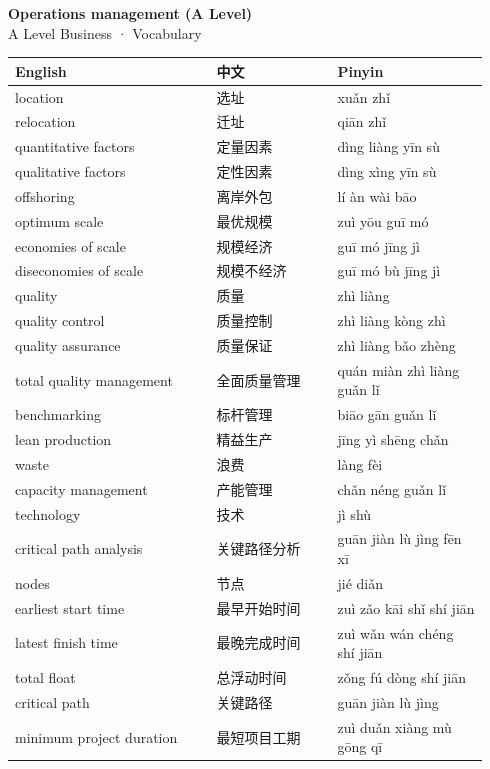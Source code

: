 \documentclass[11pt]{article}
\begin{document}
\begin{center}
  {\LARGE\bfseries Operations management (A Level)}\\[0.35em]
  {\large A Level Business · Vocabulary}
\end{center}
\vspace{0.6em}

\begin{longtable}{@{}p{0.40\linewidth}p{0.24\linewidth}p{0.30\linewidth}@{}}
\toprule
\textbf{English} & \textbf{中文} & \textbf{Pinyin} \\
\midrule
\endhead
\bottomrule
\endlastfoot
location & 选址 & xuǎn zhǐ \\
relocation & 迁址 & qiān zhǐ \\
quantitative factors & 定量因素 & dìng liàng yīn sù \\
qualitative factors & 定性因素 & dìng xìng yīn sù \\
offshoring & 离岸外包 & lí àn wài bāo \\
optimum scale & 最优规模 & zuì yōu guī mó \\
economies of scale & 规模经济 & guī mó jīng jì \\
diseconomies of scale & 规模不经济 & guī mó bù jīng jì \\
quality & 质量 & zhì liàng \\
quality control & 质量控制 & zhì liàng kòng zhì \\
quality assurance & 质量保证 & zhì liàng bǎo zhèng \\
total quality management & 全面质量管理 & quán miàn zhì liàng guǎn lǐ \\
benchmarking & 标杆管理 & biāo gān guǎn lǐ \\
lean production & 精益生产 & jīng yì shēng chǎn \\
waste & 浪费 & làng fèi \\
capacity management & 产能管理 & chǎn néng guǎn lǐ \\
technology & 技术 & jì shù \\
critical path analysis & 关键路径分析 & guān jiàn lù jìng fēn xī \\
nodes & 节点 & jié diǎn \\
earliest start time & 最早开始时间 & zuì zǎo kāi shǐ shí jiān \\
latest finish time & 最晚完成时间 & zuì wǎn wán chéng shí jiān \\
total float & 总浮动时间 & zǒng fú dòng shí jiān \\
critical path & 关键路径 & guān jiàn lù jìng \\
minimum project duration & 最短项目工期 & zuì duǎn xiàng mù gōng qī \\
\end{longtable}
\end{document}
